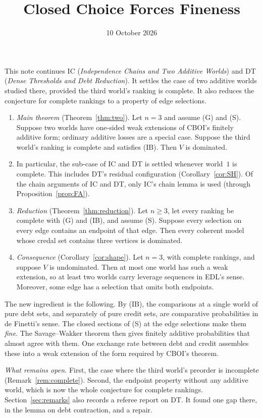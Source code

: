 \documentclass[11pt]{article}
\title{Closed Choice Forces Fineness}
\author{}\date{10 October 2026}
\theoremstyle{definition}\newtheorem{definition}[theorem]{Definition}
\theoremstyle{remark}\newtheorem{remark}[theorem]{Remark}
\begin{document}
\maketitle

\noindent
This note continues IC (\emph{Independence Chains and Two Additive Worlds})
and DT (\emph{Dense Thresholds and Debt Reduction}). It settles the case of
two additive worlds studied there, provided the third world's ranking is
complete. It also reduces the conjecture for complete rankings to a property
of edge selections.

\begin{enumerate}[leftmargin=*,itemsep=3pt]
\item \emph{Main theorem} (Theorem~\ref{thm:two}). Let $n=3$ and assume (G)
and (S). Suppose two worlds have one-sided weak extensions of CBOI's finitely
additive form; ordinary additive losses are a special case. Suppose the third
world's ranking is complete and satisfies (IB). Then $V$ is dominated.
\item In particular, the sub-case of IC and DT is settled whenever world~$1$
is complete. This includes DT's residual configuration
(Corollary~\ref{cor:SH}). Of the chain arguments of IC and DT, only IC's
chain lemma is used (through Proposition~\ref{prop:FA}).
\item \emph{Reduction} (Theorem~\ref{thm:reduction}). Let $n\ge3$, let every
ranking be complete with (G) and (IB), and assume (S). Suppose every
selection on every edge contains an endpoint of that edge. Then every
coherent model whose credal set contains three vertices is dominated.
\item \emph{Consequence} (Corollary~\ref{cor:shape}). Let $n=3$, with
complete rankings, and suppose $V$ is undominated. Then at most one world has
such a weak extension, so at least two worlds carry leverage sequences in
EDL's sense. Moreover, some edge has a selection that omits both endpoints.
\end{enumerate}
The new ingredient is the following. By (IB), the comparisons at a single
world of pure debt sets, and separately of pure credit sets, are comparative
probabilities in de Finetti's sense. The closed sections of (S) at the edge
selections make them \emph{fine}. The Savage--Wakker theorem then gives
finitely additive probabilities that almost agree with them. One exchange
rate between debt and credit assembles these into a weak extension of the
form required by CBOI's theorem.

\emph{What remains open.} First, the case where the third world's preorder
is incomplete (Remark~\ref{rem:complete}). Second, the endpoint property
without any additive world, which is now the whole conjecture for complete
rankings. Section~\ref{sec:remarks} also records a referee report on DT. It
found one gap there, in the lemma on debt contraction, and a repair.
\end{document}
